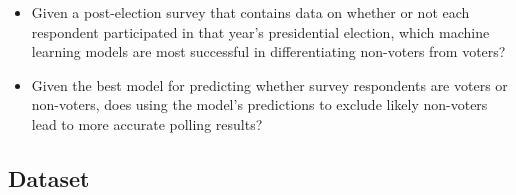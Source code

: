 \documentclass{article}
\begin{document}
	\begin{itemize}
		\item{Given a post-election survey that contains data on whether or not each respondent participated in that year's presidential election, which machine learning models are most successful in differentiating non-voters from voters?}
		\item{Given the best model for predicting whether survey respondents are voters or non-voters, does using the model's predictions to exclude likely non-voters lead to more accurate polling results?}
	\end{itemize}

	\subsection{Dataset}
	
\end{document}
